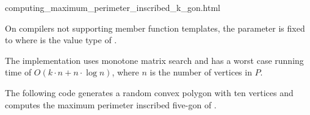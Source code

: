 \begin{ccHtmlClassFile}{computing_maximum_perimeter_inscribed_k_gon.html}
  \ccTagDefaults

  
  On compilers not supporting member function templates, the parameter
   is fixed to 
  where  is the value type of .
  
  \ccImplementation The implementation uses monotone matrix
  search\cite{akmsw-gamsa-87} and has a worst case running time of $O(k
  \cdot n + n \cdot \log n)$, where $n$ is the number of vertices in
  $P$.

  \ccExample The following code generates a random convex polygon
   with ten vertices and computes the maximum perimeter inscribed
  five-gon of .


\end{ccHtmlClassFile}

